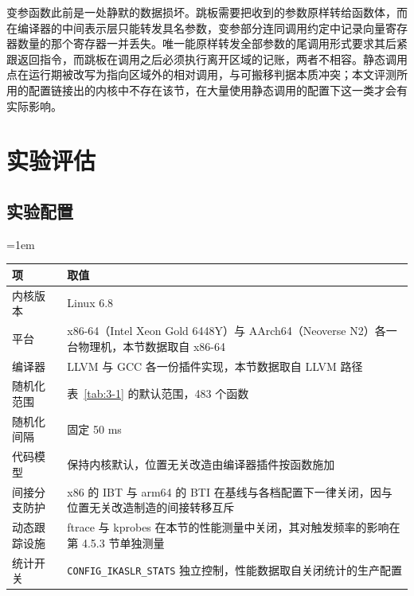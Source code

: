 变参函数此前是一处静默的数据损坏。跳板需要把收到的参数原样转给函数体，而在编译器的中间表示层只能转发具名参数，变参部分连同调用约定中记录向量寄存器数量的那个寄存器一并丢失。唯一能原样转发全部参数的尾调用形式要求其后紧跟返回指令，而跳板在调用之后必须执行离开区域的记账，两者不相容。静态调用点在运行期被改写为指向区域外的相对调用，与可搬移判据本质冲突；本文评测所用的配置链接出的内核中不存在该节，在大量使用静态调用的配置下这一类才会有实际影响。

\section{实验评估}

\subsection{实验配置}

\begin{table}[!htbp]
    \label{tab:3-6}
    \centering
    \scriptsize
    \setlength{\tabcolsep}{3pt}
    \renewcommand{\arraystretch}{1.25}
    \emergencystretch=1em
    \begin{tabular}{>{\raggedright\arraybackslash}p{}>{\raggedright\arraybackslash}p{}}
        \hline
        项 & 取值\\
        \hline
        内核版本 & Linux 6.8\\
        平台 & x86-64（Intel Xeon Gold 6448Y）与 AArch64（Neoverse N2）各一台物理机，本节数据取自 x86-64\\
        编译器 & LLVM 与 GCC 各一份插件实现，本节数据取自 LLVM 路径\\
        随机化范围 & 表~\ref{tab:3-1} 的默认范围，483 个函数\\
        随机化间隔 & 固定 50 ms\\
        代码模型 & 保持内核默认，位置无关改造由编译器插件按函数施加\\
        间接分支防护 & x86 的 IBT 与 arm64 的 BTI 在基线与各档配置下一律关闭，因与位置无关改造制造的间接转移互斥\\
        动态跟踪设施 & ftrace 与 kprobes 在本节的性能测量中关闭，其对触发频率的影响在第 4.5.3 节单独测量\\
        统计开关 & \lstinline[breaklines=false]@CONFIG_IKASLR_STATS@ 独立控制，性能数据取自关闭统计的生产配置\\
        \hline
    \end{tabular}
\end{table}

